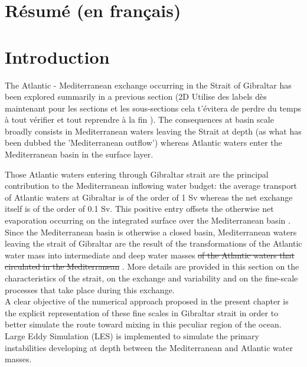\hypersetup{pdfborder=0 0 0}

\section{Résumé (en français)}

\section{Introduction}

The Atlantic - Mediterranean exchange occurring in the Strait of Gibraltar has been \color{blue} explored \color{black} summarily in a previous section (2D \color{blue} Utilise des labels dès maintenant pour les sections et les sous-sections cela t'évitera de perdre du temps à tout vérifier et tout reprendre à la fin \color{black}). \color{blue} The consequences at basin scale broadly \color{black} consists in Mediterranean waters leaving the Strait at depth (as what has been dubbed the 'Mediterranean outflow') whereas \color{blue}Atlantic\color{black} waters enter the Mediterranean basin in the surface layer.

Those Atlantic waters entering through Gibraltar strait are the principal contribution to the Mediterranean inflowing water budget: the average transport of Atlantic waters at \color{blue}Gibraltar \color{black} is of the order of 1 Sv whereas the net exchange itself is of the order of 0.1 Sv. \color{blue} This positive entry offsets the otherwise net evaporation occurring on the integrated surface \color{blue}over \color{black} the Mediterranean basin \citep{bryden_1994}.
Since the Mediterranean basin is otherwise a closed basin, Mediterranean waters leaving the strait of Gibraltar are the result of the transformations \color{blue} of the Atlantic water mass \color{black} into intermediate and deep water masses\color{blue}\sout{ of the Atlantic waters that circulated in the Mediterranean} \color{black}.
More details are provided in this section on the characteristics of the strait, \color{blue} on the exchange and variability and on the fine-scale processes that take place during this exchange.\\
A clear objective of the numerical approach proposed in the present chapter is the explicit representation of these fine scales in Gibraltar strait in order to better simulate the route toward mixing in this peculiar region of the ocean. Large Eddy Simulation (LES) is implemented to simulate the primary instabilities developing at depth between the Mediterranean and Atlantic water masses.

